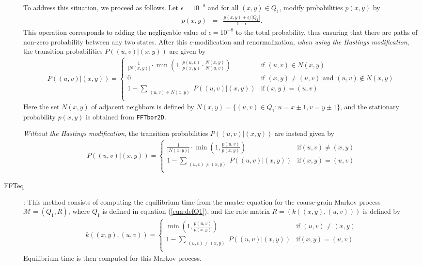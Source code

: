 \begin{description}
To address this situation, we proceed as follows. Let $\epsilon =
10^{-8}$ and for all $(x,y) \in Q_1$, modify probabilities $p(x,y)$ by
\begin{eqnarray}
\label{eqn:modifyNormalizeCellProb} p(x,y) &=& \frac{p(x,y) +
\epsilon/|Q_1|}{1+\epsilon }.
\end{eqnarray}
This operation corresponds to adding the negligeable value of
$\epsilon=10^{-8}$ to the total probability, thus ensuring that there
are paths of non-zero probability between any two states. After this
$\epsilon$-modification and renormalization, {\em when using the
Hastings modification}, the transition probabilities $P( (u,v) | (x,y)
)$ are given by
\begin{eqnarray}
\label{eqn:transitionProbabilityFFTbor2DwithHastings} P( (u,v) |(x,y)
) = \left\{
\begin{array}{ll}
\frac{1}{|N(x,y)|} \cdot \min(1, \frac{p(u,v)}{p(x,y)} \cdot
\frac{N(x,y)}{N(u,v)}) &\mbox{if $(u,v) \in N(x,y)$}\\
0 &\mbox{if $(x,y) \ne (u,v) \mbox{ and } (u,v) \not\in N(x,y)$}\\
1 - \sum_{\substack{(u,v) \in N(x,y)}} P( (u,v) | (x,y) ) &\mbox{if
$(x,y) =(u,v)$}\\
\end{array}
\right.
\end{eqnarray}
Here the set $N(x,y)$ of adjacent neighbors is defined by $N(x,y) = \{
(u,v) \in Q_1 : u = x \pm 1, v = y \pm 1 \}$, and the stationary
probability $p(x,y)$ is obtained from {\tt FFTbor2D}.

{\em Without the Hastings modification}, the transition probabilities
$P( (u,v) | (x,y) )$ are instead given by
\begin{eqnarray}
\label{eqn:transitionProbabilityFFTbor2DwithoutHastings} P( (u,v)
|(x,y) ) = \left\{
\begin{array}{ll}
\frac{1}{|N(x,y)|} \cdot \min(1, \frac{p(u,v)}{p(x,y)}) &\mbox{if
$(u,v) \ne (x,y)$}\\
1 - \sum_{\substack{(u,v) \ne (x,y)}} P( (u,v) | (x,y) ) &\mbox{if
$(x,y) =(u,v)$}\\
\end{array}
\right.
\end{eqnarray}

\item[FFTeq]: This method consists of computing the equilibrium time
from the master equation for the coarse-grain Markov process
$\mathcal{M}=(Q_1,R)$, where $Q_1$ is defined in equation
(\ref{eqn:defQ1}), and the rate matrix $R = ( k( (x,y), (u,v) ) )$ is
defined by
\begin{eqnarray}
\label{eqn:rateProbabilityFFTbor2DwithoutHastings} k( (x,y), (u,v) ) =
\left\{
\begin{array}{ll}
\min(1, \frac{p(u,v)}{p(x,y)}) &\mbox{if $(u,v) \ne (x,y)$}\\
1 - \sum_{\substack{(u,v) \ne (x,y)}} P( (u,v) | (x,y) ) &\mbox{if
$(x,y) =(u,v)$}\\
\end{array}
\right.
\end{eqnarray}
Equilibrium time is then computed for this Markov process.


\end{description}
